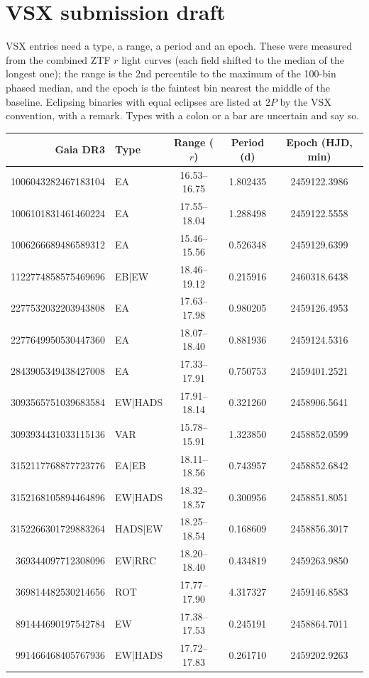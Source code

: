 \documentclass[11pt]{article}
\begin{document}
\section{VSX submission draft}
VSX entries need a type, a range, a period and an epoch. These were measured from the combined ZTF $r$ light curves (each field shifted to the median of the longest one); the range is the 2nd percentile to the maximum of the 100-bin phased median, and the epoch is the faintest bin nearest the middle of the baseline. Eclipsing binaries with equal eclipses are listed at $2P$ by the VSX convention, with a remark. Types with a colon or a bar are uncertain and say so.

{\small\setlength{\tabcolsep}{4pt}
\begin{longtable}{rlccc}
\toprule Gaia DR3 & Type & Range ($r$) & Period (d) & Epoch (HJD, min)\\\midrule\endhead
1006043282467183104 & EA & 16.53--16.75 & 1.802435 & 2459122.3986 \\
1006101831461460224 & EA & 17.55--18.04 & 1.288498 & 2459122.5558 \\
1006266689486589312 & EA & 15.46--15.56 & 0.526348 & 2459129.6399 \\
1122774858575469696 & EB|EW & 18.46--19.12 & 0.215916 & 2460318.6438 \\
2277532032203943808 & EA & 17.63--17.98 & 0.980205 & 2459126.4953 \\
2277649950530447360 & EA & 18.07--18.40 & 0.881936 & 2459124.5316 \\
2843905349438427008 & EA & 17.33--17.91 & 0.750753 & 2459401.2521 \\
3093565751039683584 & EW|HADS & 17.91--18.14 & 0.321260 & 2458906.5641 \\
3093934431033115136 & VAR & 15.78--15.91 & 1.323850 & 2458852.0599 \\
3152117768877723776 & EA|EB & 18.11--18.56 & 0.743957 & 2458852.6842 \\
3152168105894464896 & EW|HADS & 18.32--18.57 & 0.300956 & 2458851.8051 \\
3152266301729883264 & HADS|EW & 18.25--18.54 & 0.168609 & 2458856.3017 \\
369344097712308096 & EW|RRC & 18.20--18.40 & 0.434819 & 2459263.9850 \\
369814482530214656 & ROT & 17.77--17.90 & 4.317327 & 2459146.8583 \\
891444690197542784 & EW & 17.38--17.53 & 0.245191 & 2458864.7011 \\
991466468405767936 & EW|HADS & 17.72--17.83 & 0.261710 & 2459202.9263 \\

\end{longtable}}
\end{document}
